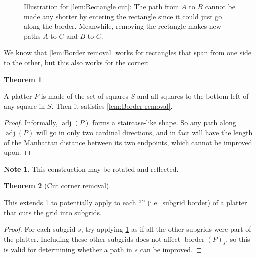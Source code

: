 \documentclass{article}
\theoremstyle{definition}%
\newtheorem{theorem}{Theorem}[section]
\newtheorem*{note}{Note}
\newcommand{\badterm}[1]{\textcolor{red}{\uwave{\textcolor{black}{#1}}}}
\newcommand{\adj}{\operatorname{adj}}
\newcommand{\border}{\operatorname{border}}
\begin{document}
\begin{figure}[htbp!]
    \centering
    \caption{Illustration for \cref{lem:Rectangle cut}: The path from $A$ to $B$ cannot be made any shorter by entering the rectangle since it could just go along the border. Meanwhile, removing the rectangle makes new paths $A$ to $C$ and $B$ to $C$.}
\end{figure}

We know that \cref{lem:Border removal} works for rectangles that span from one side to the other, but this also works for the corner:

\begin{theorem}
\label{th:Corner removal}

A platter $P$ is made of the set of squares $S$ and all squares to the bottom-left of any square in $S$. Then it satisfies \cref{lem:Border removal}.
\end{theorem}

\begin{proof}
Informally, $\adj(P)$ forms a staircase-like shape. So any path along $\adj(P)$ will go in only two cardinal directions, and in fact will have the length of the Manhattan distance between its two endpoints, which cannot be improved upon.
\end{proof}

\begin{note}
This construction may be rotated and reflected.
\end{note}

\begin{theorem}[Cut corner removal]
\label{th:Cut corner removal}

This extends \cref{th:Corner removal} to potentially apply to each ``\badterm{side}'' (i.e.\ subgrid border) of a platter that cuts the grid into subgrids.
\end{theorem}

\begin{proof}
For each subgrid $s$, try applying \cref{th:Corner removal} as if all the other subgrids were part of the platter. Including these other subgrids does not affect $\border(P)_s$, so this is valid for determining whether a path in $s$ can be improved.
\end{proof}
\end{document}
